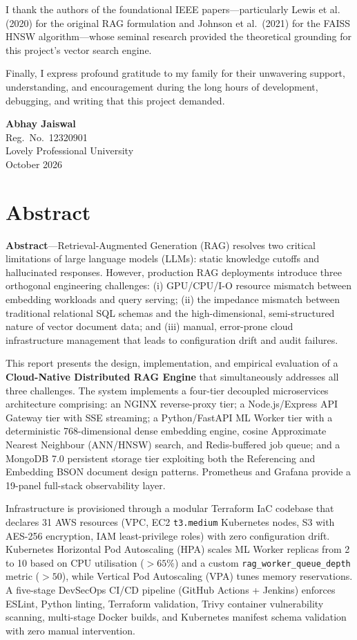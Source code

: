 \documentclass[12pt,a4paper]{report}
\begin{document}
I thank the authors of the foundational IEEE papers---particularly Lewis et al.
(2020) for the original RAG formulation and Johnson et al.\ (2021) for the
FAISS HNSW algorithm---whose seminal research provided the theoretical grounding
for this project's vector search engine.

Finally, I express profound gratitude to my family for their unwavering support,
understanding, and encouragement during the long hours of development, debugging,
and writing that this project demanded.

\vspace{1.5cm}
\noindent\textbf{Abhay Jaiswal}\\
Reg.\ No.\ 12320901\\
Lovely Professional University\\
October 2026
\newpage


\chapter*{Abstract}

\noindent\textbf{Abstract}---Retrieval-Augmented Generation (RAG) resolves two
critical limitations of large language models (LLMs): static knowledge cutoffs
and hallucinated responses. However, production RAG deployments introduce three
orthogonal engineering challenges: (i) GPU/CPU/I-O resource mismatch between
embedding workloads and query serving; (ii) the impedance mismatch between
traditional relational SQL schemas and the high-dimensional, semi-structured
nature of vector document data; and (iii) manual, error-prone cloud
infrastructure management that leads to configuration drift and audit failures.

This report presents the design, implementation, and empirical evaluation of a
\textbf{Cloud-Native Distributed RAG Engine} that simultaneously addresses all
three challenges. The system implements a four-tier decoupled microservices
architecture comprising: an NGINX reverse-proxy tier; a Node.js/Express
API Gateway tier with SSE streaming; a Python/FastAPI ML Worker tier with a
deterministic 768-dimensional dense embedding engine, cosine Approximate Nearest
Neighbour (ANN/HNSW) search, and Redis-buffered job queue; and a MongoDB 7.0
persistent storage tier exploiting both the Referencing and Embedding BSON
document design patterns. Prometheus and Grafana provide a 19-panel full-stack
observability layer.

Infrastructure is provisioned through a modular Terraform IaC codebase that
declares 31 AWS resources (VPC, EC2 \texttt{t3.medium} Kubernetes nodes, S3
with AES-256 encryption, IAM least-privilege roles) with zero configuration
drift. Kubernetes Horizontal Pod Autoscaling (HPA) scales ML Worker replicas
from 2 to 10 based on CPU utilisation ($>65\%$) and a custom
\texttt{rag\_worker\_queue\_depth} metric ($>50$), while Vertical Pod
Autoscaling (VPA) tunes memory reservations. A five-stage DevSecOps CI/CD
pipeline (GitHub Actions + Jenkins) enforces ESLint, Python linting, Terraform
validation, Trivy container vulnerability scanning, multi-stage Docker builds,
and Kubernetes manifest schema validation with zero manual intervention.
\end{document}
